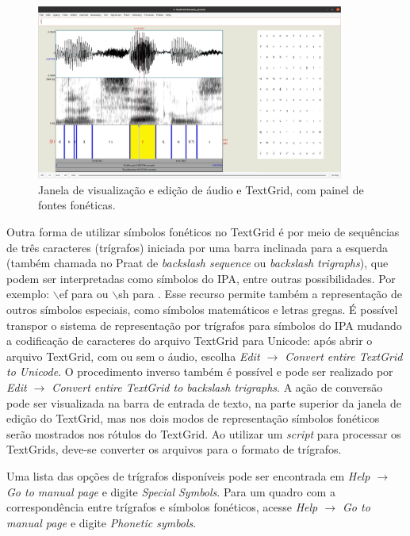 \documentclass[portuguese]{textolivre}
\begin{document}
\begin{figure}[H]
 \centering
 \includegraphics[width=0.9\textwidth]{Fig11.png}
 \caption{Janela de visualização e edição de áudio e TextGrid, com painel de fontes fonéticas.}
 \label{fig11}
\end{figure}

Outra forma de utilizar símbolos fonéticos no TextGrid é por meio de sequências de três caracteres (trígrafos) iniciada por uma barra inclinada para a esquerda (também chamada no Praat de \textit{backslash sequence} ou \textit{backslash trigraphs}), que podem ser interpretadas como símbolos do IPA, entre outras possibilidades. Por exemplo: $\backslash$ef para  ou $\backslash$sh para \textesh. Esse recurso permite também a representação de outros símbolos especiais, como símbolos matemáticos e letras gregas. É possível transpor o sistema de representação por trígrafos para símbolos do IPA mudando a codificação de caracteres do arquivo TextGrid para Unicode: após abrir o arquivo TextGrid, com ou sem o áudio, escolha \textit{Edit $\rightarrow$ Convert entire TextGrid to Unicode}. O procedimento inverso também é possível e pode ser realizado por  \textit{Edit $\rightarrow$ Convert entire TextGrid to backslash trigraphs}. A ação de conversão pode ser visualizada na barra de entrada de texto, na parte superior da janela de edição do TextGrid, mas nos dois modos de representação símbolos fonéticos serão mostrados nos rótulos do TextGrid. Ao utilizar um \textit{script} para processar os TextGrids, deve-se converter os arquivos para o formato de trígrafos.

Uma lista das opções de trígrafos disponíveis pode ser encontrada em \textit{Help $\rightarrow$ Go to manual page} e digite \textit{Special Symbols}. Para um quadro com a correspondência entre trígrafos e símbolos fonéticos, acesse \textit{Help $\rightarrow$ Go to manual page} e digite \textit{Phonetic symbols}.
\end{document}
